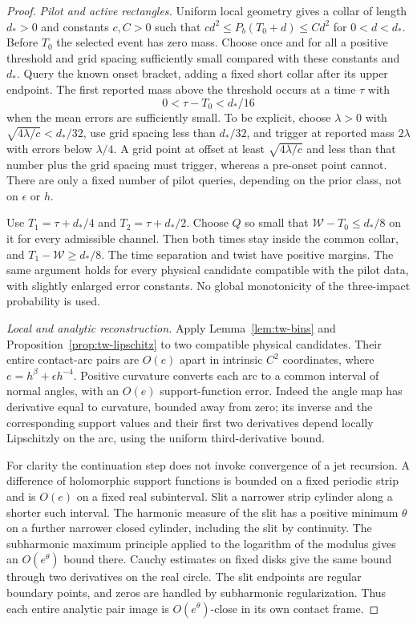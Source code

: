\begin{proof}
\emph{Pilot and active rectangles.}
Uniform local geometry gives a collar of length $d_*>0$ and constants
$c,C>0$ such that $cd^2\le P_b(T_0+d)\le Cd^2$ for
$0<d<d_*$. Before $T_0$ the selected event has zero mass. Choose
once and for all a positive threshold and grid spacing sufficiently
small compared with these constants and $d_*$. Query the known onset
bracket, adding a fixed short collar after its upper endpoint. The
first reported mass above the threshold occurs at a time $\tau$ with
\[
                         0<\tau-T_0<d_*/16
\]
when the mean errors are sufficiently small. To be explicit, choose
$\lambda>0$ with $\sqrt{4\lambda/c}<d_*/32$, use grid spacing
less than $d_*/32$, and trigger at reported mass $2\lambda$ with
errors below $\lambda/4$. A grid point at offset at least
$\sqrt{4\lambda/c}$ and less than that number plus the grid spacing
must trigger, whereas a pre-onset point cannot. There are only a fixed
number of pilot queries, depending on the prior class, not on
$\epsilon$ or $h$.

Use $T_1=\tau+d_*/4$ and $T_2=\tau+d_*/2$. Choose $Q$ so small
that $\mathcal W-T_0\le d_*/8$ on it for every admissible channel.
Then both times stay inside the common collar, and
$T_1-\mathcal W\ge d_*/8$. The time separation and twist have
positive margins. The same argument holds for every physical candidate
compatible with the pilot data, with slightly enlarged error constants.
No global monotonicity of the three-impact probability is used.

\emph{Local and analytic reconstruction.}
Apply Lemma~\ref{lem:tw-bins} and Proposition~\ref{prop:tw-lipschitz}
to two compatible physical candidates. Their entire contact-arc pairs
are $O(e)$ apart in intrinsic $C^2$ coordinates, where
$e=h^\beta+\epsilon h^{-4}$. Positive curvature converts each arc
to a common interval of normal angles, with an $O(e)$ support-function
error. Indeed the angle map has derivative equal to curvature, bounded
away from zero; its inverse and the corresponding support values and
their first two derivatives depend locally Lipschitzly on the arc,
using the uniform third-derivative bound.

For clarity the continuation step does not invoke convergence of a jet
recursion. A difference of holomorphic support functions is bounded on
a fixed periodic strip and is $O(e)$ on a fixed real subinterval. Slit
a narrower strip cylinder along a shorter such interval. The harmonic
measure of the slit has a positive minimum $\theta$ on a further
narrower closed cylinder, including the slit by continuity. The
subharmonic maximum principle applied to the logarithm of the modulus
gives an $O(e^\theta)$ bound there. Cauchy estimates on fixed disks
give the same bound through two derivatives on the real circle.
The slit endpoints are regular boundary points, and zeros are handled
by subharmonic regularization. Thus each entire analytic pair image
is $O(e^\theta)$-close in its own contact frame.


\end{proof}
